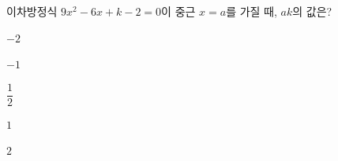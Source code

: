 이차방정식 $9x^2-6x+k-2=0$이 중근 $x=a$를 가질 때, $ak$의 값은? 
\begin{choices32}{\rule[-3ex]{0pt}{8ex}$-2$}{\rule[-3ex]{0pt}{8ex}$-1$}{\rule[-3ex]{0pt}{8ex}$\dfrac{1}{2}$}{\rule[-3ex]{0pt}{8ex}$1$}{\rule[-3ex]{0pt}{8ex}$2$}\end{choices32}
